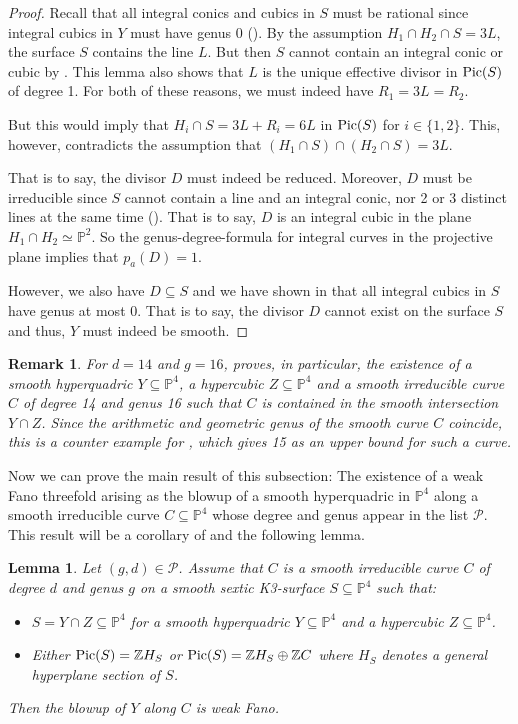 \documentclass[english,11pt,reqno]{amsart}
\newcommand{\sub}{\subseteq}
\newcommand{\Ptwo}{\mathbb{P}^2}
\newcommand{\Pfour}{\mathbb{P}^4}
\newcommand{\Z}{\mathbb{Z}}
\newcommand{\Pic}{\textup{Pic}}
\newtheorem{rmk}[thm]{Remark}
\newtheorem{lem}[thm]{Lemma}
\begin{document}
\begin{proof}
Recall that all integral conics and cubics in $S$ must be rational since integral cubics in $Y$ must have genus 0 (). By the assumption $H_1\cap H_2\cap S=3L$, the surface $S$ contains the line $L$. But then $S$ cannot contain an integral conic or cubic by . This lemma also shows that $L$ is the unique effective divisor in $\Pic(S)$ of degree 1. For both of these reasons, we must indeed have $R_1=3L=R_2$. \par 
But this would imply that $H_i\cap S=3L+R_i=6L$ in $\Pic(S)$ for $i\in\{1,2\}$. This, however, contradicts the assumption that $(H_1\cap S) \cap (H_2\cap S)=3L$.\par 
That is to say, the divisor $D$ must indeed be reduced. Moreover, $D$ must be irreducible since $S$ cannot contain a line and an integral conic, nor 2 or 3 distinct lines at the same time (). That is to say, $D$ is an integral cubic in the plane $H_1\cap H_2\simeq \Ptwo$. So the genus-degree-formula for integral curves in the projective plane implies that $p_a(D)=1$. \par  
However, we also have $D\sub S$ and we have shown in  that all integral cubics in $S$ have genus at most 0. That is to say, the divisor $D$ cannot exist on the surface $S$ and thus, $Y$ must indeed be smooth.
\end{proof}
%
%
\begin{rmk} \label{rmk:counterexample}
For $d=14$ and $g=16$,  proves, in particular, the existence of a smooth hyperquadric $Y\sub \Pfour$, a hypercubic $Z\sub \Pfour$ and a smooth irreducible curve $C$ of degree 14 and genus 16 such that $C$ is contained in the smooth intersection $Y \cap Z$. Since the arithmetic and geometric genus of the smooth curve $C$ coincide, this is a counter example for \cite[Thm.\ 1.4]{De_Cataldo-Genus_of_curves_on_3d_quadric}, which gives 15 as an upper bound for such a curve.
\end{rmk}
%
%
%
Now we can prove the main result of this subsection: The existence of a weak Fano threefold arising as the blowup of a smooth hyperquadric in $\Pfour$ along a smooth irreducible curve $C\sub \Pfour$ whose degree and genus appear in the list $\mathcal{P}$. This result will be a corollary of   and the following lemma.
%
%
\begin{lem} \label{lem:existence_gdpairs_yielding_weak_Fano}
Let $(g,d)\in \mathcal{P}$. Assume that $C$ is a smooth irreducible curve $C$ of degree $d$ and genus $g$ on a smooth sextic K3-surface $S\sub \Pfour$ such that: 
\begin{itemize}
\item $S=Y\cap Z\sub \Pfour$ for a smooth hyperquadric $Y\sub \Pfour$ and a hypercubic $Z\sub \Pfour$.
\item Either $\Pic(S)= \Z H_S$ or $\Pic(S)=\Z H_S \oplus \Z C$ where $H_S$ denotes a general hyperplane section of $S$.
\end{itemize}
Then the blowup of $Y$ along $C$ is weak Fano.
\end{lem}
\end{document}
